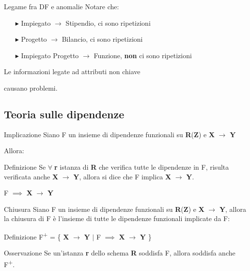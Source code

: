 \documentclass{beamer}
\begin{document}
\begin{frame}{Legame fra DF e anomalie}
    Notare che:
    \begin{itemize}
        \item[$\blacktriangleright$] Impiegato $\rightarrow$ Stipendio, ci sono ripetizioni
        \item[$\blacktriangleright$] Progetto $\rightarrow$ Bilancio, ci sono ripetizioni
        \item[$\blacktriangleright$] Impiegato Progetto $\rightarrow$ Funzione, \textbf{non} ci sono ripetizioni
    \end{itemize}
    \vfill
    \Large Le informazioni legate ad attributi non chiave\par causano problemi.
\end{frame}

\subsection{Teoria sulle dipendenze}
\begin{frame}{Implicazione}
    Siano F un insieme di dipendenze funzionali su \textbf{R}(\textbf{Z}) e \textbf{X} $\rightarrow$ \textbf{Y}\par
    Allora:
    \begin{block}{Definizione}
        Se $\forall \;$\textbf{r} istanza di \textbf{R} che verifica tutte le dipendenze in F, risulta verificata anche \textbf{X} $\rightarrow$ \textbf{Y}, allora si dice che F implica \textbf{X} $\rightarrow$ \textbf{Y}.
    \end{block}
    \vfill
    \centering
    \Huge F $\implies$ \textbf{X} $\rightarrow$ \textbf{Y}
    \vfill
\end{frame}

\begin{frame}{Chiusura}
    Siano F un insieme di dipendenze funzionali su \textbf{R}(\textbf{Z}) e \textbf{X} $\rightarrow$ \textbf{Y}, allora la chiusura di F è l'insieme di tutte le dipendenze funzionali implicate da F: 
    \begin{block}{Definizione}
        \centering
        F\textsuperscript{+} = \{ \textbf{X} $\rightarrow$ \textbf{Y} $|$ F $\implies$ \textbf{X} $\rightarrow$ \textbf{Y} \}
    \end{block}
    
    \begin{alertblock}{Osservazione}
        Se un'istanza \textbf{r} dello schema \textbf{R} soddisfa F, allora soddisfa anche F\textsuperscript{+}.
    \end{alertblock}
\end{frame}
\end{document}
